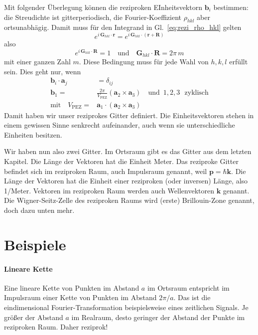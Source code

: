 Mit folgender Überlegung können die reziproken EInheitsvektorn $\mathbf{b}_i$ bestimmen: die Streudichte ist gitterperiodisch, die Fourier-Koeffizient $\rho_{hkl}$ aber ortsunabhägig. Damit muss für den Integrand in Gl.~\ref{eq:rezi_rho_hkl} gelten
\begin{equation}
 e^{i \, \mathbf{G}_{hkl} \cdot \mathbf{r}}  =  e^{i \, \mathbf{G}_{hkl} \cdot (\mathbf{r} + \mathbf{R})}
\end{equation}
also 
\begin{equation}
 e^{i \, \mathbf{G}_{hkl} \cdot  \mathbf{R}} = 1 \quad \text{und} \quad \mathbf{G}_{hkl} \cdot  \mathbf{R} = 2 \pi \, m
\end{equation}
mit einer ganzen Zahl $m$. Diese Bedingung muss für jede Wahl von $h,k,l$ erfüllt sein. Dies geht nur, wenn
\begin{align}
 \mathbf{b}_i \cdot \mathbf{a}_j & = \delta_{ij}  \\
  \mathbf{b}_1 = &\frac{2 \pi}{V_\text{PEZ}} \left(  \mathbf{a}_2 \times \mathbf{a}_3 \right)  \quad \text{und } \, 1,2,3 \, \,\text{ zyklisch} \\
  \text{mit} \quad  V_\text{PEZ} = &  \mathbf{a}_1 \cdot \left(  \mathbf{a}_2   \times \mathbf{a}_3 \right)
\end{align}
Damit haben wir unser reziprokes Gitter definiert. Die Einheitsvektoren stehen in einem gewissen Sinne senkrecht aufeinander, auch wenn  sie unterschiedliche Einheiten besitzen.


Wir haben nun also zwei Gitter. Im Ortsraum gibt es das Gitter aus dem letzten Kapitel. Die Länge der Vektoren hat die Einheit Meter. Das reziproke Gitter befindet sich im reziproken Raum, auch Impulsraum genannt, weil $\mathbf{p} = \hbar \mathbf{k}$. Die Länge der Vektoren hat die Einheit einer reziproken (oder inversen) Länge, also 1/Meter. Vektoren im reziproken Raum werden auch Wellenvektoren $\mathbf{k}$ genannt. Die Wigner-Seitz-Zelle des reziproken Raums wird (erste) Brillouin-Zone genannt, doch dazu unten mehr.


\section{Beispiele}

\paragraph{Lineare Kette} Eine lineare Kette von Punkten im Abstand $a$ im Ortsraum entspricht im Impulsraum einer Kette von Punkten im Abstand $2 \pi/a$. Das ist die eindimensional Fourier-Transformation beispielsweise eines zeitlichen Signals. Je größer der Abstand $a$ im Realraum, desto geringer der Abstand der Punkte im reziproken Raum. Daher reziprok!

